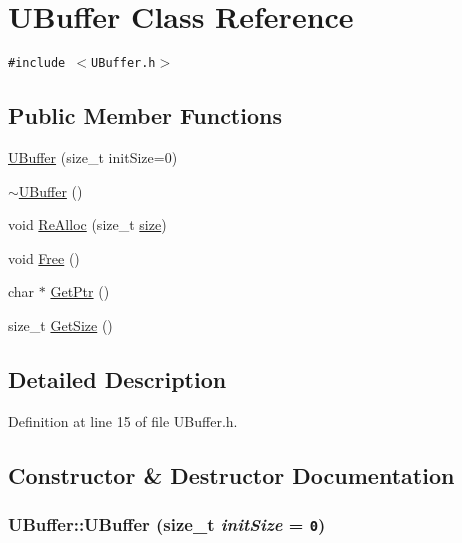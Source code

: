 \hypertarget{class_u_buffer}{
\section{UBuffer Class Reference}
\label{class_u_buffer}
}
{\tt \#include $<$UBuffer.h$>$}

\subsection*{Public Member Functions}
\begin{CompactItemize}
\item 
\hyperlink{class_u_buffer_31fdb601cd3980aad904ef18c92f5d04}{UBuffer} (size\_\-t initSize=0)
\item 
\hyperlink{class_u_buffer_799c169f9d7aaa79ec60df93d985df52}{$\sim$UBuffer} ()
\item 
void \hyperlink{class_u_buffer_d30479ef19c7c97a705fe2aa6070b774}{ReAlloc} (size\_\-t \hyperlink{glext__bak_8h_3d1e3edfcf61ca2d831883e1afbad89e}{size})
\item 
void \hyperlink{class_u_buffer_785592f1792b7bdf20294628da84c8d7}{Free} ()
\item 
char $\ast$ \hyperlink{class_u_buffer_1b9175d37e8a140a439e5e1db4dea010}{GetPtr} ()
\item 
size\_\-t \hyperlink{class_u_buffer_d1f01266203b801a0578f54a45404fd4}{GetSize} ()
\end{CompactItemize}


\subsection{Detailed Description}


Definition at line 15 of file UBuffer.h.

\subsection{Constructor \& Destructor Documentation}
\hypertarget{class_u_buffer_31fdb601cd3980aad904ef18c92f5d04}{
\subsubsection[{UBuffer}]{\setlength{\rightskip}{0pt plus 5cm}UBuffer::UBuffer (size\_\-t {\em initSize} = {\tt 0})}}
\label{class_u_buffer_31fdb601cd3980aad904ef18c92f5d04}





